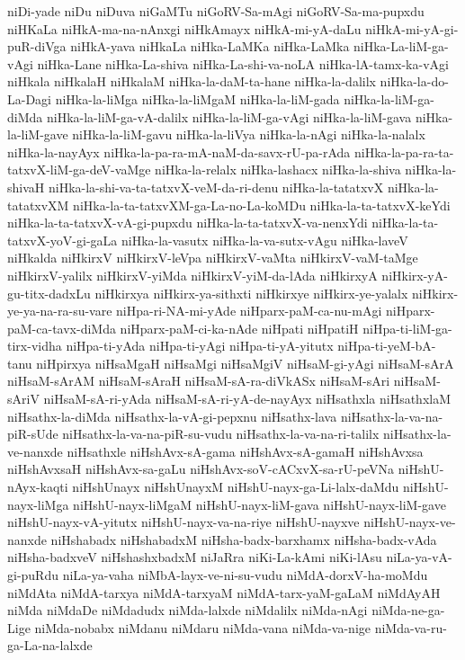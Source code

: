 {niDi-yade
niDu
niDuva
niGaMTu
niGoRV-Sa-mAgi
niGoRV-Sa-ma-pupxdu
niHKaLa
niHkA-ma-na-nAnxgi
niHkAmayx
niHkA-mi-yA-daLu
niHkA-mi-yA-gi-puR-diVga
niHkA-yava
niHkaLa
niHka-LaMKa
niHka-LaMka
niHka-La-liM-ga-vAgi
niHka-Lane
niHka-La-shiva
niHka-La-shi-va-noLA
niHka-lA-tamx-ka-vAgi
niHkala
niHkalaH
niHkalaM
niHka-la-daM-ta-hane
niHka-la-dalilx
niHka-la-do-La-Dagi
niHka-la-liMga
niHka-la-liMgaM
niHka-la-liM-gada
niHka-la-liM-ga-diMda
niHka-la-liM-ga-vA-dalilx
niHka-la-liM-ga-vAgi
niHka-la-liM-gava
niHka-la-liM-gave
niHka-la-liM-gavu
niHka-la-liVya
niHka-la-nAgi
niHka-la-nalalx
niHka-la-nayAyx
niHka-la-pa-ra-mA-naM-da-savx-rU-pa-rAda
niHka-la-pa-ra-ta-tatxvX-liM-ga-deV-vaMge
niHka-la-relalx
niHka-lashacx
niHka-la-shiva
niHka-la-shivaH
niHka-la-shi-va-ta-tatxvX-veM-da-ri-denu
niHka-la-tatatxvX
niHka-la-tatatxvXM
niHka-la-ta-tatxvXM-ga-La-no-La-koMDu
niHka-la-ta-tatxvX-keYdi
niHka-la-ta-tatxvX-vA-gi-pupxdu
niHka-la-ta-tatxvX-va-nenxYdi
niHka-la-ta-tatxvX-yoV-gi-gaLa
niHka-la-vasutx
niHka-la-va-sutx-vAgu
niHka-laveV
niHkalda
niHkirxV
niHkirxV-leVpa
niHkirxV-vaMta
niHkirxV-vaM-taMge
niHkirxV-yalilx
niHkirxV-yiMda
niHkirxV-yiM-da-lAda
niHkirxyA
niHkirx-yA-gu-titx-dadxLu
niHkirxya
niHkirx-ya-sithxti
niHkirxye
niHkirx-ye-yalalx
niHkirx-ye-ya-na-ra-su-vare
niHpa-ri-NA-mi-yAde
niHparx-paM-ca-nu-mAgi
niHparx-paM-ca-tavx-diMda
niHparx-paM-ci-ka-nAde
niHpati
niHpatiH
niHpa-ti-liM-ga-tirx-vidha
niHpa-ti-yAda
niHpa-ti-yAgi
niHpa-ti-yA-yitutx
niHpa-ti-yeM-bA-tanu
niHpirxya
niHsaMgaH
niHsaMgi
niHsaMgiV
niHsaM-gi-yAgi
niHsaM-sArA
niHsaM-sArAM
niHsaM-sAraH
niHsaM-sA-ra-diVkASx
niHsaM-sAri
niHsaM-sAriV
niHsaM-sA-ri-yAda
niHsaM-sA-ri-yA-de-nayAyx
niHsathxla
niHsathxlaM
niHsathx-la-diMda
niHsathx-la-vA-gi-pepxnu
niHsathx-lava
niHsathx-la-va-na-piR-sUde
niHsathx-la-va-na-piR-su-vudu
niHsathx-la-va-na-ri-talilx
niHsathx-la-ve-nanxde
niHsathxle
niHshAvx-sA-gama
niHshAvx-sA-gamaH
niHshAvxsa
niHshAvxsaH
niHshAvx-sa-gaLu
niHshAvx-soV-cACxvX-sa-rU-peVNa
niHshU-nAyx-kaqti
niHshUnayx
niHshUnayxM
niHshU-nayx-ga-Li-lalx-daMdu
niHshU-nayx-liMga
niHshU-nayx-liMgaM
niHshU-nayx-liM-gava
niHshU-nayx-liM-gave
niHshU-nayx-vA-yitutx
niHshU-nayx-va-na-riye
niHshU-nayxve
niHshU-nayx-ve-nanxde
niHshabadx
niHshabadxM
niHsha-badx-barxhamx
niHsha-badx-vAda
niHsha-badxveV
niHshashxbadxM
niJaRra
niKi-La-kAmi
niKi-lAsu
niLa-ya-vA-gi-puRdu
niLa-ya-vaha
niMbA-layx-ve-ni-su-vudu
niMdA-dorxV-ha-moMdu
niMdAta
niMdA-tarxya
niMdA-tarxyaM
niMdA-tarx-yaM-gaLaM
niMdAyAH
niMda
niMdaDe
niMdadudx
niMda-lalxde
niMdalilx
niMda-nAgi
niMda-ne-ga-Lige
niMda-nobabx
niMdanu
niMdaru
niMda-vana
niMda-va-nige
niMda-va-ru-ga-La-na-lalxde
}
